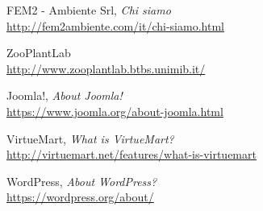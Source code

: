 \begin{thebibliography}{99}

	FEM2 - Ambiente Srl, \emph{Chi siamo} \\
	\url{http://fem2ambiente.com/it/chi-siamo.html}

	ZooPlantLab \\
	\url{http://www.zooplantlab.btbs.unimib.it/}

	Joomla!, \emph{About Joomla!} \\
	\url{https://www.joomla.org/about-joomla.html}

	VirtueMart, \emph{What is VirtueMart?} \\
	\url{http://virtuemart.net/features/what-is-virtuemart}
	
	WordPress, \emph{About WordPress?} \\
	\url{https://wordpress.org/about/}
	
	
	
\end{thebibliography}